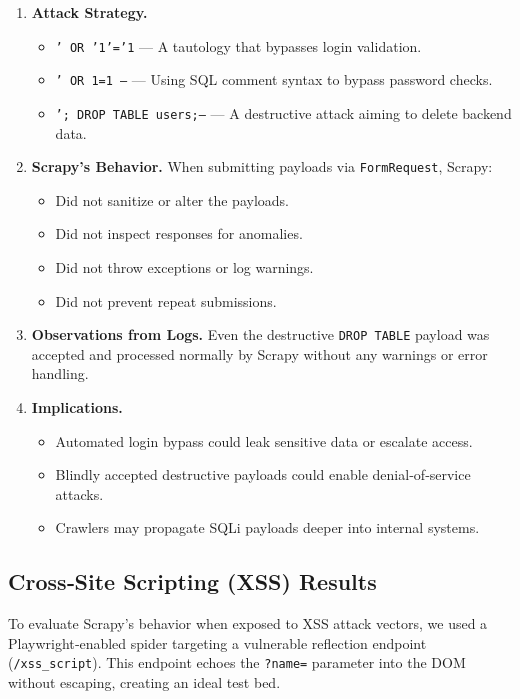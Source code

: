 \begin{enumerate}[label=\alph*)]
  \item \textbf{Attack Strategy.}
    \begin{itemize}[topsep=0pt,itemsep=2pt]
      \item \texttt{' OR '1'='1} — A tautology that bypasses login validation.
      \item \texttt{' OR 1=1 --} — Using SQL comment syntax to bypass password checks.
      \item \texttt{'; DROP TABLE users;--} — A destructive attack aiming to delete backend data.
    \end{itemize}

  \item \textbf{Scrapy’s Behavior.} When submitting payloads via \texttt{FormRequest}, Scrapy:
    \begin{itemize}[topsep=0pt,itemsep=2pt]
      \item Did not sanitize or alter the payloads.
      \item Did not inspect responses for anomalies.
      \item Did not throw exceptions or log warnings.
      \item Did not prevent repeat submissions.
    \end{itemize}

  \item \textbf{Observations from Logs.}  
    Even the destructive \texttt{DROP TABLE} payload was accepted and processed normally by Scrapy without any warnings or error handling.

  \item \textbf{Implications.}
    \begin{itemize}[topsep=0pt,itemsep=2pt]
      \item Automated login bypass could leak sensitive data or escalate access.
      \item Blindly accepted destructive payloads could enable denial‐of‐service attacks.
      \item Crawlers may propagate SQLi payloads deeper into internal systems.
    \end{itemize}
\end{enumerate}

\subsection{Cross‐Site Scripting (XSS) Results}
To evaluate Scrapy’s behavior when exposed to XSS attack vectors, we used a Playwright‐enabled spider targeting a vulnerable reflection endpoint (\texttt{/xss\_script}). This endpoint echoes the \texttt{?name=} parameter into the DOM without escaping, creating an ideal test bed.

